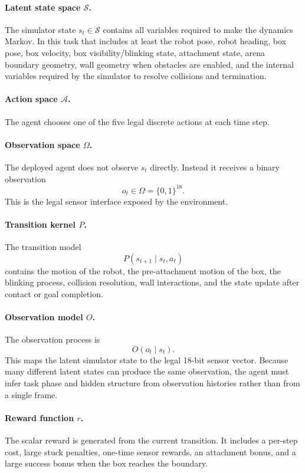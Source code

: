 \documentclass[11pt]{article}
\begin{document}
\paragraph{Latent state space \(\mathcal{S}\).}
The simulator state
\(s_t\in\mathcal{S}\) contains all variables required to make the dynamics Markov. In
this task that includes at least the robot pose, robot heading, box pose, box velocity,
box visibility/blinking state, attachment state, arena boundary geometry, wall geometry
when obstacles are enabled, and the internal variables required by the simulator to
resolve collisions and termination.

\paragraph{Action space \(\mathcal{A}\).}
The agent chooses one of the five legal discrete actions at each time step.

\paragraph{Observation space \(\Omega\).}
The deployed agent does not observe \(s_t\) directly. Instead it receives a binary
observation
\[
  o_t\in\Omega=\{0,1\}^{18}.
\]
This is the legal sensor interface exposed by the environment.

\paragraph{Transition kernel \(P\).}
The transition model
\[
  P(s_{t+1}\mid s_t,a_t)
\]
contains the motion of the robot, the pre-attachment motion of the box, the blinking
process, collision resolution, wall interactions, and the state update after contact or
goal completion.

\paragraph{Observation model \(O\).}
The observation process is
\[
  O(o_t\mid s_t).
\]
This maps the latent simulator state to the legal 18-bit sensor vector. Because many
different latent states can produce the same observation, the agent must infer task phase
and hidden structure from observation histories rather than from a single frame.

\paragraph{Reward function \(r\).}
The scalar reward is generated from the current transition. It includes a per-step cost,
large stuck penalties, one-time sensor rewards, an attachment bonus, and a large success
bonus when the box reaches the boundary.
\end{document}
